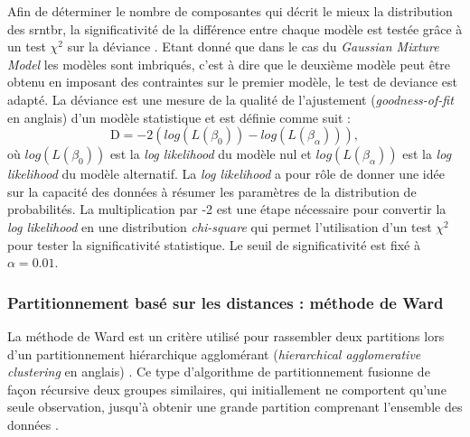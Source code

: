 Afin de déterminer le nombre de composantes qui décrit le mieux la distribution des \gls{srntbr}, la significativité de la différence entre chaque 
modèle est testée grâce à un test $\chi^2$ sur la déviance \citep[Chapitre~6]{James2013}. Etant donné que dans le cas du \textit{Gaussian Mixture Model} les modèles
sont imbriqués, c'est à dire que le deuxième modèle peut être obtenu en imposant des contraintes sur le premier modèle, le test de 
deviance est adapté. La déviance est une mesure de la qualité de l'ajustement (\textit{goodness-of-fit} 
en anglais) d'un modèle statistique et est définie comme suit :
\begin{equation}
\label{eq:tbr_deviance}
\text{D} = -2(log(L(\beta_{0})) - log(L(\beta_{\alpha}))),
\end{equation}
où $log(L(\beta_{0}))$ est la \textit{log likelihood} du modèle nul et $log(L(\beta_{\alpha}))$ est la \textit{log likelihood} du modèle alternatif. 
La \textit{log likelihood} a pour rôle de donner une idée sur la capacité des données à résumer les paramètres de la distribution de probabilités. 
La multiplication par -2 est une étape nécessaire pour convertir la \textit{log likelihood} en une distribution \textit{chi-square} qui permet 
l'utilisation d'un test $\chi^2$ pour tester la significativité statistique. Le seuil de significativité est fixé à $\alpha = 0.01$.

\subsubsection{Partitionnement basé sur les distances : méthode de Ward}
La méthode de Ward est un critère utilisé pour rassembler deux partitions lors d'un partitionnement hiérarchique agglomérant (\textit{hierarchical agglomerative clustering} 
en anglais) \citep{Ward1963}. Ce type d'algorithme de partitionnement fusionne de façon récursive deux groupes similaires, qui initiallement ne comportent qu'une seule observation, jusqu'à obtenir une
grande partition comprenant l'ensemble des données \citep[Chapitre~10]{James2013}.

